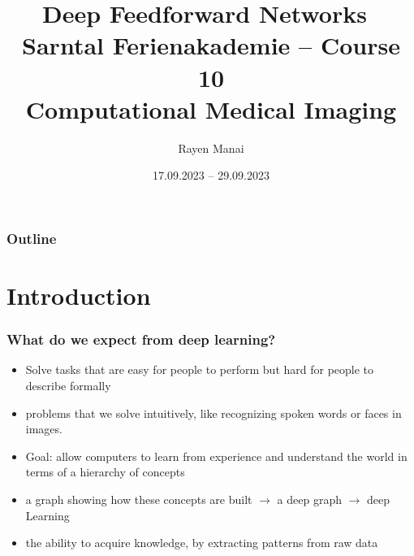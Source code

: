 \documentclass{beamer}
\title[Backpropagation and training NN]{
	\Large Deep Feedforward Networks~\cite{Goodfellow-et-al-2016} \\
	[5mm] \normalsize Sarntal Ferienakademie -- Course 10 \\
	Computational Medical Imaging
}
\author{Rayen Manai}
\institute[]{
    TU München\\
}
\date{17.09.2023 -- 29.09.2023}
\begin{document}
\begin{frame}
	\titlepage
\end{frame}

\begin{frame}
	\frametitle{Outline}
	\tableofcontents
\end{frame}

\section{Introduction}
\begin{frame}
 \frametitle{What do we expect from deep learning?}
	\begin{itemize}
		\item Solve tasks that are easy for people to perform but hard for people to describe formally 
		\item problems that we solve intuitively, like recognizing spoken words or faces in images.
			\pause
		\item Goal: allow computers to learn from experience and understand the world in terms of a hierarchy of concepts
		\item a graph showing how these concepts are built $\rightarrow$ a deep graph $\rightarrow$ deep Learning
		\item the ability to acquire knowledge, by extracting patterns from raw data
	\end{itemize}

\end{frame}
\end{document}
